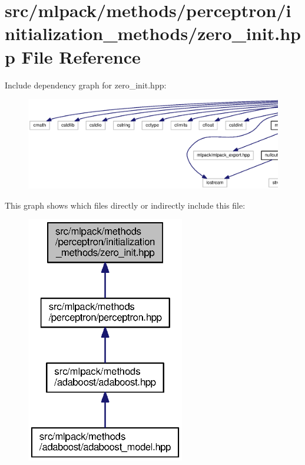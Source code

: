 \section{src/mlpack/methods/perceptron/initialization\+\_\+methods/zero\+\_\+init.hpp File Reference}
\label{perceptron_2initialization__methods_2zero__init_8hpp}
Include dependency graph for zero\+\_\+init.\+hpp\+:
\nopagebreak
\begin{figure}[H]
\begin{center}
\leavevmode
\includegraphics[width=350pt]{perceptron_2initialization__methods_2zero__init_8hpp__incl}
\end{center}
\end{figure}
This graph shows which files directly or indirectly include this file\+:
\nopagebreak
\begin{figure}[H]
\begin{center}
\leavevmode
\includegraphics[width=196pt]{perceptron_2initialization__methods_2zero__init_8hpp__dep__incl}
\end{center}
\end{figure}
